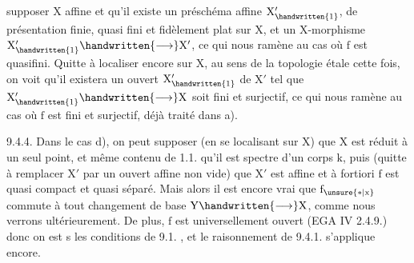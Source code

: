supposer $\mathrm{X}$ affine et qu'il existe un préschéma affine $\mathrm{X'_{\handwritten{1}}}$, de
présentation finie, quasi fini et fidèlement plat sur $\mathrm{X}$, et un
$\mathrm{X}$-morphisme $\mathrm{X'_{\handwritten{1}} \handwritten{\longrightarrow} X'}$, ce qui nous ramène au cas où $\mathrm{f}$ est quasi\handwritten{-}fini.
Quitte à localiser encore sur $\mathrm{X}$, au sens de la topologie étale
cette fois, on voit qu'il existera un ouvert $\mathrm{X'_{\handwritten{1}}}$ de $\mathrm{X'}$ tel que
$\mathrm{X'_{\handwritten{1}} \handwritten{\longrightarrow} X}$ soit fini et surjectif, ce qui nous ramène au cas où $\mathrm{f}$ est
fini et surjectif, déjà traité dans a).

9.4.4. Dans le cas d), on peut supposer (en se localisant sur $\mathrm{X}$)
que $\mathrm{X}$ est réduit à un seul point, et même contenu de 1.1. qu'il est
spectre d'un corps $\mathrm{k}$, puis (quitte à remplacer $\mathrm{X'}$ par un ouvert
affine non vide) que $\mathrm{X'}$ est affine et à fortiori $\mathrm{f}$ est quasi compact
et quasi séparé. Mais alors il est encore vrai que $\mathrm{f_{\unsure{*|x}}}$ commute
\margin{\handwritten{$\mathrm{\uparrow}$}}
à tout changement de base $\mathrm{Y \handwritten{\longrightarrow} X}$, comme nous verrons ultérieurement.
De plus, $\mathrm{f}$ est universellement ouvert (EGA IV 2.4.9.) donc on
est s les conditions de 9.1. , et le raisonnement de 9.4.1. s'applique
encore.


